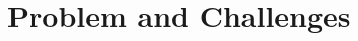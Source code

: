 \documentclass[sigconf,authordraft]{acmart}
\begin{document}



\section{Problem and Challenges}\label{Sec::Methods}

\end{document}

